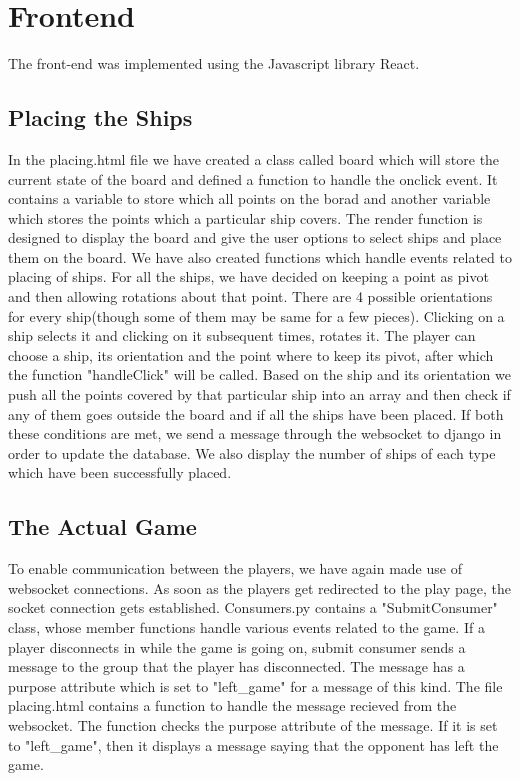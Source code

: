 \documentclass[titlepage]{article}
\begin{document}
\section{Frontend}
The front-end was implemented using the Javascript library React. 
\subsection{Placing the Ships}
In the placing.html file we have created a class called board which will store the current state of the board and defined a function to handle the onclick event. It contains a variable to store which all points on the borad and another variable which stores the points which a particular ship covers. The render function is designed to display the board and give the user options to select ships and place them on the board. We have also created functions which handle events related to placing of ships. For all the ships, we have decided on keeping a point as pivot and then allowing rotations about that point. There are 4 possible orientations for every ship(though some of them may be same for a few pieces). Clicking on a ship selects it and clicking on it subsequent times, rotates it. The player can choose a ship, its orientation and the point where to keep its pivot, after which the function "handleClick" will be called. Based on the ship and its orientation we push all the points covered by that particular ship into an array and then check if any of them goes outside the board and if all the ships have been placed. If both these conditions are met, we send a message through the websocket to django in order to update the database. We also display the number of ships of each type which have been successfully placed.

\subsection{The Actual Game}
To enable communication between the players, we have again made use of websocket connections. As soon as the players get redirected to the play page, the socket connection gets established. Consumers.py contains a "SubmitConsumer" class, whose member functions handle various events related to the game. If a player disconnects in while the game is going on, submit consumer sends a message to the group that the player has disconnected. The message has a purpose attribute which is set to "left\_game" for a message of this kind. The file placing.html contains a function to handle the message recieved from the websocket. The function checks the purpose attribute of the message. If it is set to "left\_game", then it displays a message saying that the opponent has left the game.
\end{document}
